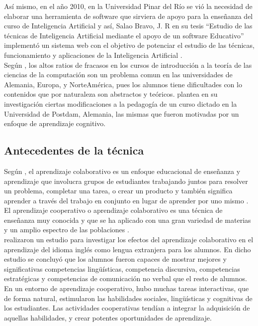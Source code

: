Así mismo, en el año 2010, en la Universidad Pinar del Río se vió la necesidad de elaborar una herramienta de software que sirviera de apoyo para la enseñanza del curso de Inteligencia Artificial y así, Salao Bravo, J. R en su tesis “Estudio de las técnicas de Inteligencia Artificial mediante el apoyo de un software Educativo” implementó un sistema web con el objetivo de potenciar el estudio de las técnicas, funcionamiento y aplicaciones de la Inteligencia Artificial \cite{salao_bravo_estudio_2010}.\\

Según , los altos ratios de fracasos en los cursos de introducción a la teoría de las ciencias de la computación son un problema comun en las universidades de Alemania, Europa, y NorteAmérica, pues los alumnos tiene dificultades con lo contenidos que por naturaleza son abstractos y teóricos. \cite{knobelsdorf_teaching_2014} plantea en su investigación ciertas modificaciones a la pedagogía de un curso dictado en la Universidad de Postdam, Alemania, las mismas que fueron motivadas por un enfoque de aprendizaje cognitivo.

\subsection{Antecedentes de la técnica}

Según \cite{laal_collaborative_2012}, el aprendizaje colaborativo es un enfoque educacional de enseñanza y aprendizaje que involucra grupos de estudiantes trabajando juntos para resolver un problema, completar una tarea, o crear un producto y también significa aprender a través del trabajo en conjunto en lugar de aprender por uno mismo \cite{barkley_collaborative_2012}.\\

El aprendizaje cooperativo o aprendizaje colaborativo es una técnica de enseñanza muy conocida y que se ha aplicado con una gran variedad de materias y un amplio espectro de las poblaciones \cite{beck_experimental_2008}.\\

 realizaron un estudio para investigar los efectos del aprendizaje colaborativo en el aprendizaje del idioma inglés como lengua extranjera para los alumnos. En dicho estudio se concluyó que los alumnos fueron capaces de mostrar mejores y significativas competencias lingüísticas, competencia discursiva, competencias estratégicas y competencias de comunicación no verbal que el resto de alumnos. En un entorno de aprendizaje cooperativo, hubo muchas tareas interactivas, que de forma natural, estimularon las habilidades sociales, lingüísticas y cognitivas de los estudiantes. Las actividades cooperativas tendían a integrar la adquisición de aquellas habilidades, y crear potentes oportunidades de aprendizaje.\\

